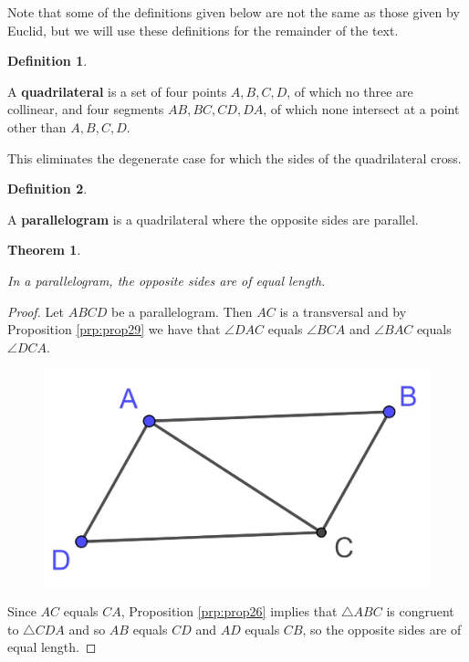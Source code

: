 \documentclass[
]{book}
\newtheorem{theorem}{Theorem}[chapter]
\theoremstyle{definition}
\newtheorem{definition}{Definition}[chapter]
\theoremstyle{definition}
\theoremstyle{definition}
\theoremstyle{definition}
\theoremstyle{remark}
\begin{document}
Note that some of the definitions given below are not the same as those given by Euclid, but we will use these definitions for the remainder of the text.

\begin{definition}
\protect\hypertarget{def:unlabeled-div-156}{}\label{def:unlabeled-div-156}

A \textbf{quadrilateral} is a set of four points \(A, B, C, D\), of which no three are collinear, and four segments \(AB, BC, CD, DA\), of which none intersect at a point other than \(A,B,C,D\).

\end{definition}

This eliminates the degenerate case for which the sides of the quadrilateral cross.

\begin{definition}
\protect\hypertarget{def:unlabeled-div-157}{}\label{def:unlabeled-div-157}

A \textbf{parallelogram} is a quadrilateral where the opposite sides are parallel.

\end{definition}

\begin{theorem}
\protect\hypertarget{thm:unlabeled-div-158}{}\label{thm:unlabeled-div-158}

In a parallelogram, the opposite sides are of equal length.\label{thm_parallelogram_opp_sides}

\end{theorem}

\begin{proof}

Let \(ABCD\) be a parallelogram. Then \(AC\) is a transversal and by Proposition \ref{prp:prop29} we have that \(\angle DAC\) equals \(\angle BCA\) and \(\angle BAC\) equals \(\angle DCA\).

\begin{figure}

{\centering \includegraphics[width=0.2\linewidth]{images/Parallelogram1} 

}

\end{figure}

Since \(AC\) equals \(CA\), Proposition \ref{prp:prop26} implies that \(\triangle ABC\) is congruent to \(\triangle CDA\) and so \(AB\) equals \(CD\) and \(AD\) equals \(CB\), so the opposite sides are of equal length.

\end{proof}
\end{document}
